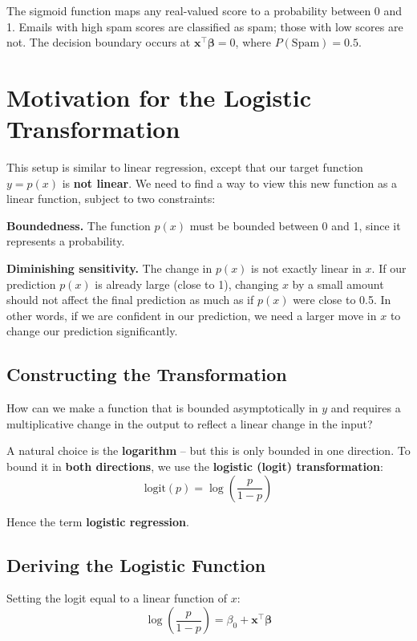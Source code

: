 \documentclass[main.tex]{subfiles}
\begin{document}
The sigmoid function maps any real-valued score to a probability between 0 and 1. Emails with high spam scores are classified as spam; those with low scores are not. The decision boundary occurs at $\mathbf{x}^\top\boldsymbol{\beta} = 0$, where $P(\text{Spam}) = 0.5$.

\section{Motivation for the Logistic Transformation}

This setup is similar to linear regression, except that our target function $y = p(x)$ is \textbf{not linear}. We need to find a way to view this new function as a linear function, subject to two constraints:

\textbf{Boundedness.} The function $p(x)$ must be bounded between 0 and 1, since it represents a probability.

\textbf{Diminishing sensitivity.} The change in $p(x)$ is not exactly linear in $x$. If our prediction $p(x)$ is already large (close to 1), changing $x$ by a small amount should not affect the final prediction as much as if $p(x)$ were close to 0.5. In other words, if we are confident in our prediction, we need a larger move in $x$ to change our prediction significantly.

\subsection{Constructing the Transformation}

How can we make a function that is bounded asymptotically in $y$ and requires a multiplicative change in the output to reflect a linear change in the input?

A natural choice is the \textbf{logarithm} -- but this is only bounded in one direction. To bound it in \textbf{both directions}, we use the \textbf{logistic (logit) transformation}:
$$\text{logit}(p) = \log\left(\frac{p}{1-p}\right)$$

Hence the term \textbf{logistic regression}.

\subsection{Deriving the Logistic Function}

Setting the logit equal to a linear function of $x$:
$$\log\left(\frac{p}{1-p}\right) = \beta_0 + \mathbf{x}^\top \boldsymbol{\beta}$$
\end{document}
